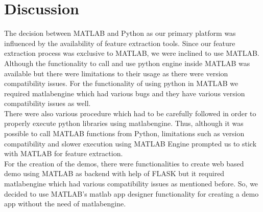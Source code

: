 \section{Discussion}
The decision between MATLAB and Python as our primary platform was influenced by the availability of feature extraction tools. Since our feature extraction process was exclusive to MATLAB, we were inclined to use MATLAB. Although the functionality to call and use python engine inside MATLAB was available but there were limitations to their usage as there were version compatibility issues. For the functionality of using python in MATLAB we required matlabengine which had various bugs and they have various version compatibility issues as well.\\
There were also various procedure which had to be carefully followed in order to properly execute python libraries using matlabengine. 
Thus, although it was possible to call MATLAB functions from Python, limitations such as version compatibility and slower execution using MATLAB Engine prompted us to stick with MATLAB for feature extraction.\\
For the creation of the demos, there were functionalities to create web based demo using MATLAB as backend with help of FLASK but it required matlabengine which had  various compatibility issues as mentioned before. So, we decided to use MATLAB's matlab app designer functionality for creating a demo app without the need of matlabengine.


